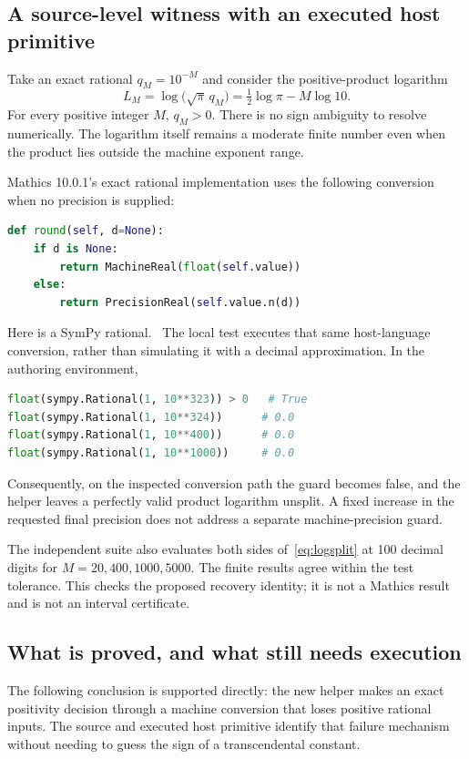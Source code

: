\documentclass[11pt,letterpaper]{article}
\newcommand{\code}[1]{\texttt{\detokenize{#1}}}
\begin{document}
\subsection{A source-level witness with an executed host primitive}
Take an exact rational $q_M=10^{-M}$ and consider the positive-product logarithm
\begin{equation}
 L_M=\log\bigl(\sqrt{\pi}\,q_M\bigr)
     =\tfrac12\log\pi-M\log10.
 \label{eq:logsplit}
\end{equation}
For every positive integer $M$, $q_M>0$. There is no sign ambiguity to resolve numerically. The logarithm itself remains a moderate finite number even when the product lies outside the machine exponent range.

Mathics 10.0.1's exact rational implementation uses the following conversion when no precision is supplied:
\begin{lstlisting}[language=Python]
def round(self, d=None):
    if d is None:
        return MachineReal(float(self.value))
    else:
        return PrecisionReal(self.value.n(d))
\end{lstlisting}
Here \code{self.value} is a SymPy rational.~\cite{mathicsatoms}
The local test executes that same host-language conversion, rather than simulating it with a decimal approximation. In the authoring environment,
\begin{lstlisting}[language=Python]
float(sympy.Rational(1, 10**323)) > 0   # True
float(sympy.Rational(1, 10**324))      # 0.0
float(sympy.Rational(1, 10**400))      # 0.0
float(sympy.Rational(1, 10**1000))     # 0.0
\end{lstlisting}
Consequently, on the inspected conversion path the guard \code{TrueQ[N[q_M] > 0]} becomes false, and the helper leaves a perfectly valid product logarithm unsplit. A fixed increase in the requested final precision does not address a separate machine-precision guard.

The independent suite also evaluates both sides of~\eqref{eq:logsplit} at 100 decimal digits for $M=20,400,1000,5000$. The finite results agree within the test tolerance. This checks the proposed recovery identity; it is not a Mathics result and is not an interval certificate.

\subsection{What is proved, and what still needs execution}
The following conclusion is supported directly: the new helper makes an exact positivity decision through a machine conversion that loses positive rational inputs. The source and executed host primitive identify that failure mechanism without needing to guess the sign of a transcendental constant.
\end{document}

